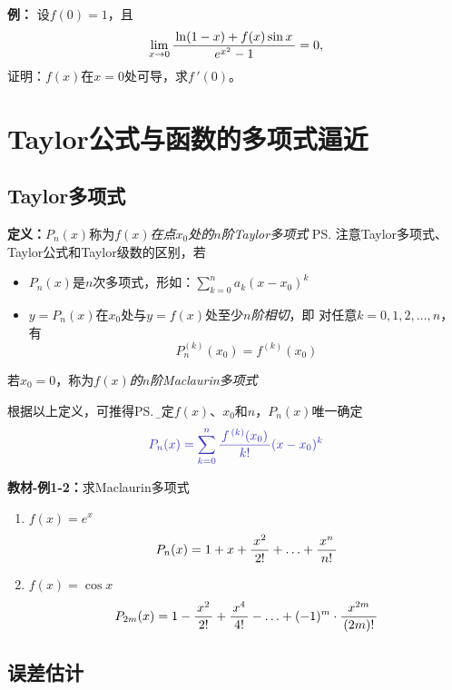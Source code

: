 {\bf 例：}
设$f(0)=1$，且
$$\lim\limits_{x\to{0}}\displaystyle\frac{\,{\ln(1-x)+f(x)\sin x}\,}{\,{e^{x^2}-1}\,}=0,$$
证明：$f(x)$在$x=0$处可导，求$f\,'(0)$。

\section{Taylor公式与函数的多项式逼近}

\subsection{Taylor多项式}

{\bf 定义：}$P_n(x)$称为{\it $f(x)$在点$x_0$处的$n$阶Taylor多项式}
\ps{注意Taylor多项式、Taylor公式和Taylor级数的区别}，若
\begin{itemize}
  \setlength{\itemindent}{1cm}
  \item $P_n(x)$是$n$次多项式，形如：$\sum\limits_{k=0}^na_k(x-x_0)^k$
  \item $y=P_n(x)$在$x_0$处与$y=f(x)$处至少{\it $n$阶相切}，即
  对任意$k=0,1,2,\ldots,n$，有
  $$P^{(k)}_n(x_0)=f^{(k)}(x_0)$$
\end{itemize}
若$x_0=0$，称为{\it $f(x)$的$n$阶Maclaurin多项式}

根据以上定义，可推得\ps{\b 给定$f(x)$、$x_0$和$n$，$P_n(x)$唯一确定}
$${\b P_n(x)=\sum\limits_{k=0}^n\df{f^{\,(k)}(x_0)}{k!}(x-x_0)^k}$$

{\bf 教材-例1-2：}求Maclaurin多项式
\begin{enumerate}[(1)]
  \setlength{\itemindent}{1cm}
  \item $f(x)=e^x$ 
  $${P_n(x)=1+x+\displaystyle\frac{\,{x^2}\,}{\,{2!}\,}+\ldots+\displaystyle\frac{\,{x^n}\,}{\,{n!}\,}}$$ 
  \item $f(x)=\cos x$ 
  $${P_{2m}(x)=1-\displaystyle\frac{\,{x^2}\,}{\,{2!}\,}+\displaystyle\frac{\,{x^4}\,}{\,{4!}\,}-\ldots+(-1)^m\cdot\displaystyle\frac{\,{x^{2m}}\,}{\,{(2m)!}\,}}$$
\end{enumerate}

\subsection{误差估计}

